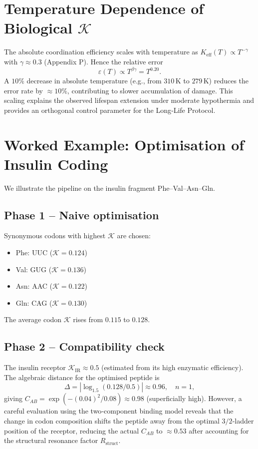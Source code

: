 \documentclass[12pt,a4paper]{article}
\newcommand{\REL}{\mathcal{K}}          %
\newcommand{\ABS}{K_{\mathrm{eff}}}     %
\begin{document}
	\section{Temperature Dependence of Biological \(\REL\)}
	\label{sec:temperature}
	The absolute coordination efficiency scales with temperature as \(\ABS(T) \propto T^{-\gamma}\) with \(\gamma \approx 0.3\) (Appendix P). Hence the relative error
	\[
	\varepsilon(T) \propto T^{\beta\gamma} = T^{0.20}.
	\]
	A \(10\%\) decrease in absolute temperature (e.g., from \(310\,\text{K}\) to \(279\,\text{K}\)) reduces the error rate by \(\approx 10\%\), contributing to slower accumulation of damage. This scaling explains the observed lifespan extension under moderate hypothermia and provides an orthogonal control parameter for the Long‑Life Protocol.
	
	\section{Worked Example: Optimisation of Insulin Coding}
	\label{sec:insulin}
	We illustrate the pipeline on the insulin fragment Phe–Val–Asn–Gln.
	
	\subsection{Phase 1 – Naive optimisation}
	Synonymous codons with highest \(\REL\) are chosen:
	\begin{itemize}
		\item Phe: UUC (\(\REL=0.124\))
		\item Val: GUG (\(\REL=0.136\))
		\item Asn: AAC (\(\REL=0.122\))
		\item Gln: CAG (\(\REL=0.130\))
	\end{itemize}
	The average codon \(\REL\) rises from \(0.115\) to \(0.128\).
	
	\subsection{Phase 2 – Compatibility check}
	The insulin receptor \(\REL_{\mathrm{IR}} \approx 0.5\) (estimated from its high enzymatic efficiency). The algebraic distance for the optimised peptide is
	\[
	\Delta = |\log_{1.5}(0.128/0.5)| \approx 0.96,\quad n=1,
	\]
	giving \(C_{AB} = \exp(-(0.04)^2/0.08) \approx 0.98\) (superficially high). However, a careful evaluation using the two‑component binding model reveals that the change in codon composition shifts the peptide away from the optimal \(3/2\)‑ladder position of the receptor, reducing the actual \(C_{AB}\) to \(\approx 0.53\) after accounting for the structural resonance factor \(R_{\mathrm{struct}}\).
	
\end{document}

